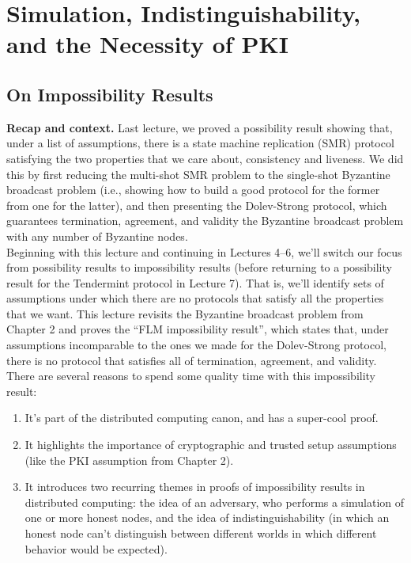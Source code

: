 \chapter{Simulation, Indistinguishability, and the Necessity of PKI}
\section{On Impossibility Results}
\textbf{Recap and context.} Last lecture, we proved a possibility result showing that, under a
list of assumptions, there is a state machine replication (SMR) protocol satisfying the two
properties that we care about, consistency and liveness. We did this by first reducing the
multi-shot SMR problem to the single-shot Byzantine broadcast problem (i.e., showing how
to build a good protocol for the former from one for the latter), and then presenting the
Dolev-Strong protocol, which guarantees termination, agreement, and validity the Byzantine
broadcast problem with any number of Byzantine nodes.\\
Beginning with this lecture and continuing in Lectures 4–6, we’ll switch our focus from
possibility results to impossibility results (before returning to a possibility result for the
Tendermint protocol in Lecture 7). That is, we’ll identify sets of assumptions under which
there are no protocols that satisfy all the properties that we want. This lecture revisits
the Byzantine broadcast problem from Chapter 2 and proves the “FLM impossibility result”,
which states that, under assumptions incomparable to the ones we made for the Dolev-Strong
protocol, there is no protocol that satisfies all of termination, agreement, and validity. There
are several reasons to spend some quality time with this impossibility result:
\begin{enumerate}
    \item It’s part of the distributed computing canon, and has a super-cool proof.
    \item It highlights the importance of cryptographic and trusted setup assumptions (like the
PKI assumption from Chapter 2).
    \item It introduces two recurring themes in proofs of impossibility results in distributed
computing: the idea of an adversary, who performs a simulation of one or more honest
nodes, and the idea of indistinguishability (in which an honest node  can’t distinguish between different worlds in which different behavior
would be expected).
\end{enumerate}

